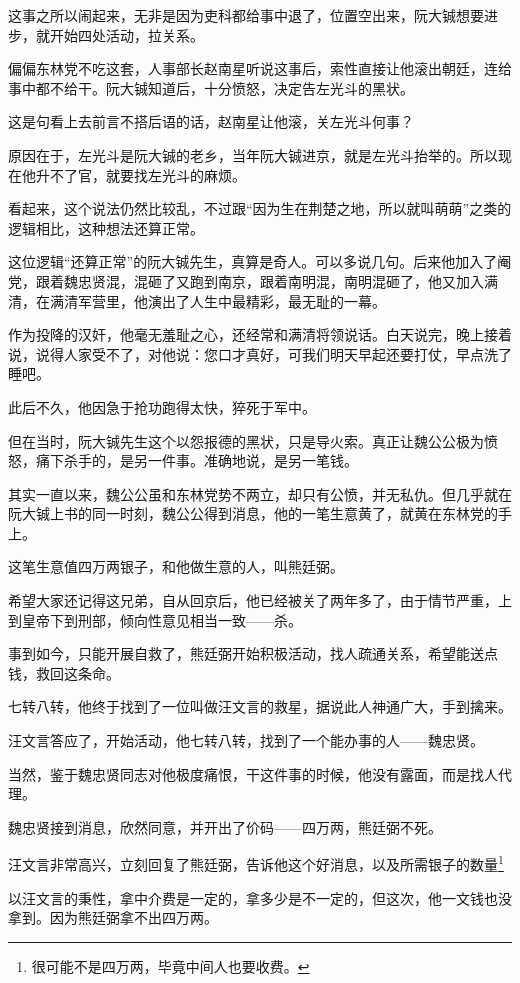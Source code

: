 \begin{multicols}{\theparacolNo}
		这事之所以闹起来，无非是因为吏科都给事中退了，位置空出来，阮大铖想要进步，就开始四处活动，拉关系。

		偏偏东林党不吃这套，人事部长赵南星听说这事后，索性直接让他滚出朝廷，连给事中都不给干。阮大铖知道后，十分愤怒，决定告左光斗的黑状。

		这是句看上去前言不搭后语的话，赵南星让他滚，关左光斗何事？

		原因在于，左光斗是阮大铖的老乡，当年阮大铖进京，就是左光斗抬举的。所以现在他升不了官，就要找左光斗的麻烦。

		看起来，这个说法仍然比较乱，不过跟“因为生在荆楚之地，所以就叫萌萌”之类的逻辑相比，这种想法还算正常。

		这位逻辑“还算正常”的阮大铖先生，真算是奇人。可以多说几句。后来他加入了阉党，跟着魏忠贤混，混砸了又跑到南京，跟着南明混，南明混砸了，他又加入满清，在满清军营里，他演出了人生中最精彩，最无耻的一幕。

		作为投降的汉奸，他毫无羞耻之心，还经常和满清将领说话。白天说完，晚上接着说，说得人家受不了，对他说：您口才真好，可我们明天早起还要打仗，早点洗了睡吧。

		此后不久，他因急于抢功跑得太快，猝死于军中。

		但在当时，阮大铖先生这个以怨报德的黑状，只是导火索。真正让魏公公极为愤怒，痛下杀手的，是另一件事。准确地说，是另一笔钱。

		其实一直以来，魏公公虽和东林党势不两立，却只有公愤，并无私仇。但几乎就在阮大铖上书的同一时刻，魏公公得到消息，他的一笔生意黄了，就黄在东林党的手上。

		这笔生意值四万两银子，和他做生意的人，叫熊廷弼。

		希望大家还记得这兄弟，自从回京后，他已经被关了两年多了，由于情节严重，上到皇帝下到刑部，倾向性意见相当一致——杀。

		事到如今，只能开展自救了，熊廷弼开始积极活动，找人疏通关系，希望能送点钱，救回这条命。

		七转八转，他终于找到了一位叫做汪文言的救星，据说此人神通广大，手到擒来。

		汪文言答应了，开始活动，他七转八转，找到了一个能办事的人——魏忠贤。

		当然，鉴于魏忠贤同志对他极度痛恨，干这件事的时候，他没有露面，而是找人代理。

		魏忠贤接到消息，欣然同意，并开出了价码——四万两，熊廷弼不死。

		汪文言非常高兴，立刻回复了熊廷弼，告诉他这个好消息，以及所需银子的数量\footnote{很可能不是四万两，毕竟中间人也要收费。}

		以汪文言的秉性，拿中介费是一定的，拿多少是不一定的，但这次，他一文钱也没拿到。因为熊廷弼拿不出四万两。


\end{multicols}
